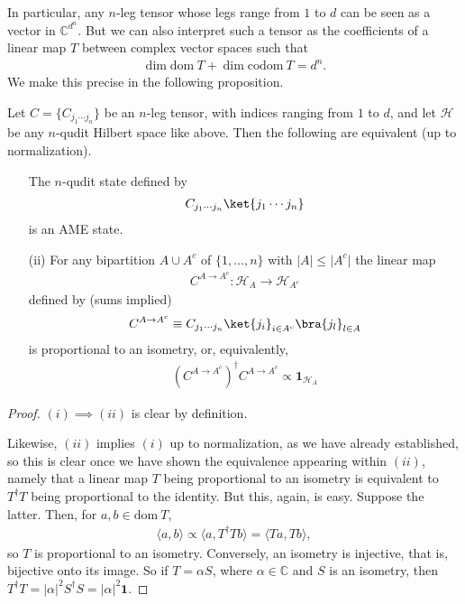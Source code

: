 In particular, any $n$-leg tensor whose legs range from $1$ to $d$ can be seen as a vector in $\mathbb{C}^{d^n}$. But we can also interpret such a tensor as the coefficients of a linear map $T$ between complex vector spaces such that 
\begin{align*}
\dim\mathrm{dom~} T + \dim\mathrm{codom~} T = d^n.
\end{align*}
We make this precise in the following proposition.

\begin{proposition}\label{prop:tensorAME}
Let $C=\{C_{j_1\cdots j_n}\}$ be an $n$-leg tensor, with indices ranging from $1$ to $d$, and let $\mathcal{H}$ be any $n$-qudit Hilbert space like above. Then the following are equivalent (up to normalization).
\begin{itemize}
\item[\text{(i)}] The $n$-qudit state defined by 
\begin{align*}
C_{j_1\cdots j_n}\ket{j_1\cdots j_n}
\end{align*}
is an AME state.
\item[(ii)] For any bipartition $A\cup A^c$ of $\{1,\ldots, n\}$ with $\lvert A \rvert\leq \lvert A^c \rvert$ the linear map
\begin{align*}
C^{A\to A^c} : \mathcal{H}_A \rightarrow\mathcal{H}_{A^c}
\end{align*}
defined by (sums implied)
\begin{align*}
C^{A\to A^c}\equiv C_{j_1\cdots j_n} \ket{j_i}_{i\in A^c}\bra{j_l}_{l\in A}
\end{align*}
is proportional to an isometry, or, equivalently, 
\begin{align*}
\left(C^{A\to A^c}\right)^\dagger C^{A\to A^c} \propto \mathbf{1}_{\mathcal{H}_A}
\end{align*}
\end{itemize}
\begin{proof}
$(i)\implies (ii)$ is clear by definition.

 Likewise, $(ii)$ implies $(i)$ up to normalization, as we have already established, so this is clear once we have shown the equivalence appearing within $(ii)$, namely that a linear map $T$ being proportional to an isometry is equivalent to $T^\dagger T$ being proportional to the identity. But this, again, is easy.
Suppose the latter. Then, for $a,b\in\mathrm{dom~}T$,
\begin{align*}
\langle a, b\rangle \propto \langle a, T^\dagger T b \rangle = \langle Ta, Tb \rangle,
\end{align*}
so $T$ is proportional to an isometry. Conversely, an isometry is injective, that is, bijective onto its image. So if $T=\alpha S$, where $\alpha\in \mathbb{C}$ and $S$ is an isometry, then $T^\dagger T = \lvert \alpha \rvert^2 S^\dagger S = \lvert \alpha \rvert^2 \mathbf{1}$.
\end{proof}
\end{proposition}

